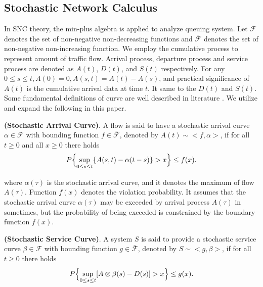 \documentclass[runningheads]{llncs}
\begin{document}
\subsection{Stochastic Network Calculus}
In SNC theory, the min-plus algebra is applied to analyze queuing system.
Let $\mathcal{F}$ denotes the set of non-negative non-decreasing functions and $\mathcal{\bar{F}}$ denotes the set of non-negative non-increasing function.
We employ the cumulative process to represent amount of traffic flow.
Arrival process, departure process and service process are denoted as $A(t)$, $D(t)$, and $S(t)$ respectively.
For any $0 \leqslant s \leqslant t, A(0)=0, A(s,t) = A(t) - A(s)$, and practical significance of $A(t)$ is the cumulative arrival data at time $t$.
It same to the $D(t)$ and $S(t)$.
Some fundamental definitions of curve are well described in literature \cite{b4}.
We utilize and expand the following in this paper.

\begin{definition}\label{def_SAC}
{\bfseries (Stochastic Arrival Curve)}.
A flow is said to have a stochastic arrival curve $\alpha\in\mathcal{F}$ with bounding function $f\in\mathcal{\bar{F}}$, denoted by $A(t) \sim <f,\alpha>$, if for all $t \geq 0$ and all $x\geq0$ there holds
\begin{equation}\label{eq_sac}
P\Bigl\{\sup_{0\leq s \leq t}\{A(s,t) - \alpha(t-s)\} > x \Bigr\} \leq f(x).
\end{equation}
\end{definition}

where $\alpha(\tau)$ is the stochastic arrival curve, and it denotes the maximum of flow $A(\tau)$.
Function $f(x)$ denotes the violation probability.
It assumes that the stochastic arrival curve $\alpha(\tau)$ may be exceeded by arrival process $A(\tau)$ in sometimes, but the probability of being exceeded is constrained by the boundary function $f(x)$.

\begin{definition}\label{def_SSC}
{\bfseries(Stochastic Service Curve)}. A system $S$ is said to provide a stochastic service curve $\beta\in\mathcal{F}$ with bounding function $g \in \mathcal{\bar{F}}$, denoted by $S \sim<g, \beta>$, if for all $t\geq0$ there holds
\begin{equation}\label{eq_ssc}
P\Bigl\{\sup_{0\leq s \leq t}[A\otimes\beta(s) - D(s)] > x \Bigr\} \leq g(x).
\end{equation}
\end{definition}
\end{document}
